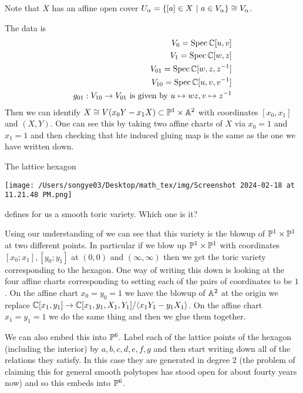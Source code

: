 \documentclass[12pt]{article}
\begin{document}
\begin{remark}
	Note that $X$ has an affine open cover $U_\alpha = \set{[a]\in X \st a\in V_\alpha} \cong V_\alpha$.
\end{remark}
\begin{example}
	 The data is \begin{align*}
		V_0 = \Spec \C[u,v]            \\
		V_1 = \Spec \C[w,z]            \\
		V_{01} = \Spec \C[w,z,\inv{z}] \\
		V_{10} = \Spec \C[u,v,\inv{v}] \\
		g_{01}:V_{10} \to V_{01} \text{ is given by } u\mapsto wz, v\mapsto \inv{z}
	\end{align*}
	Then we can identify $X \cong V(x_0Y - x_1X)\subset \P^1\times \A^2$ with coordinates $[x_0,x_1]$ and $(X,Y)$. One can see this
	by taking two affine charts of $X$ via $x_0 = 1$ and $x_1 = 1$ and then checking that hte induced gluing map is the same as the one
	we have written down.
\end{example}

\begin{example}
	The lattice hexagon \begin{center}
		\texttt{[image: /Users/songye03/Desktop/math\_tex/img/Screenshot 2024-02-18 at 11.21.48 PM.png]}
	\end{center} defines for us a smooth toric variety. Which one is it?

	\hfill

	Using our understanding of  we can see that this variety is the
	blowup of $\P^1 \times \P^1$ at two different points.  In particular if we blow up $\P^1\times \P^1$ with coordinates $[x_0;x_1],[y_0;y_1]$ at $(0,0)$ and $(\infty,\infty)$
	then we get the toric variety corresponding to the hexagon. One way of writing this down is looking at the four affine charts corresponding to
	setting each of the pairs of coordinates to be $1$. On the affine chart $x_0 = y_0 = 1$ we have the blowup of $\A^2$ at the origin
	we replace $\C[x_1,y_1] \to \C[x_1,y_1,X_1,Y_1]/\ideal{x_1Y_1 - y_1X_1}$. On the affine chart $x_1 = y_1 = 1$ we do the same thing
	and then we glue them together.

	\hfill


	\hfill


	We can also embed this into $\P^6$. Label each of the lattice points of the hexagon (including the interior)
	by $a,b,c,d,e,f,g$ and then start writing down all of the relations they satisfy. In this case they are generated in
	degree $2$ (the problem of claiming this for general smooth polytopes has stood open for about fourty years now) and so
	this embeds into $\P^6$.
\end{example}
\end{document}
